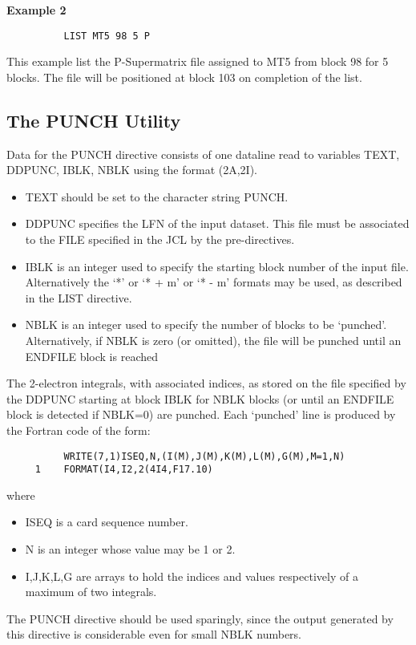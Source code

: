 \documentclass[11pt,fleqn]{article}
\begin{document}
{\bf Example 2}
{
\footnotesize
\begin{verbatim}
          LIST MT5 98 5 P
\end{verbatim}
}
This example list the P-Supermatrix  file assigned to MT5 
from block 98 for 5
blocks. The file will be positioned at block 103 on completion of the
list.


\subsection{The PUNCH Utility}

Data for the PUNCH directive consists of one dataline read to variables
TEXT, DDPUNC, IBLK, NBLK using the format (2A,2I).
\begin{itemize}
\item  TEXT should be set to the character string PUNCH.
\item  DDPUNC specifies the LFN of the input dataset. This file
must be associated to the FILE specified in the JCL by
the pre-directives.
\item  IBLK is an integer used to specify the starting block number
of the input file. Alternatively the `*' or `* + m' or
`* - m' formats may be used, as described in the LIST
directive.
\item  NBLK is an integer used to specify the number of blocks to be
`punched'. Alternatively, if NBLK is zero (or omitted),
the file will be punched until an ENDFILE block is reached
\end{itemize}
 The 2-electron integrals, with associated indices, as stored on the
file specified by the DDPUNC starting at block IBLK for NBLK
blocks (or until an ENDFILE block is detected if NBLK=0) are punched.
Each `punched' line is produced by the Fortran code of the form:

{
\footnotesize
\begin{verbatim}
          WRITE(7,1)ISEQ,N,(I(M),J(M),K(M),L(M),G(M),M=1,N)
     1    FORMAT(I4,I2,2(4I4,F17.10)
\end{verbatim}
}
where
\begin{itemize}
\item  ISEQ is a card sequence number.
\item  N is an integer whose value may be 1 or 2.
\item  I,J,K,L,G are arrays to hold the indices and values respectively
of a maximum of two integrals.
\end{itemize}
 The PUNCH directive should be used sparingly, since the output
generated by this directive is considerable even for small NBLK numbers.\\
\end{document}
